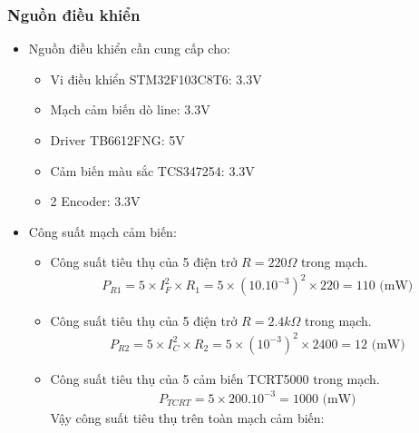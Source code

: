             \subsubsection{Nguồn điều khiển}
                \begin{itemize}
                    \item Nguồn điều khiển cần cung cấp cho:
                    \begin{itemize}
                        \item Vi điều khiển STM32F103C8T6: 3.3V
                        \item Mạch cảm biến dò line: 3.3V
                        \item Driver TB6612FNG: 5V
                        \item Cảm biến màu sắc TCS347254: 3.3V
                        \item 2 Encoder: 3.3V
                    \end{itemize}
                    \item Công suất mạch cảm biến:
                    \begin{itemize}
                        \item Công suất tiêu thụ của 5 điện trở $R = 220 \Omega$ trong mạch. \\
                        \begin{align}
                            P_{R1} = 5 \times I_{F}^2 \times R_1 = 5 \times (10.10^{-3})^2 \times 220 = 110 \text{ (mW)}
                        \end{align}
                        \item Công suất tiêu thụ của 5 điện trở $R = 2.4 k\Omega$ trong mạch. \\
                        \begin{align}
                            P_{R2} = 5 \times I_{C}^2 \times R_2 = 5 \times (10^{-3})^2 \times 2400 = 12 \text{ (mW)}
                        \end{align}
                        \item Công suất tiêu thụ của 5 cảm biến TCRT5000 trong mạch. \\
                        \begin{align}
                            P_{TCRT} = 5 \times 200.10^{-3} = 1000 \text{ (mW)}
                        \end{align}
                        Vậy công suất tiêu thụ trên toàn mạch cảm biến:
                        \begin{align}

\end{align}
\end{itemize}
\end{itemize}
